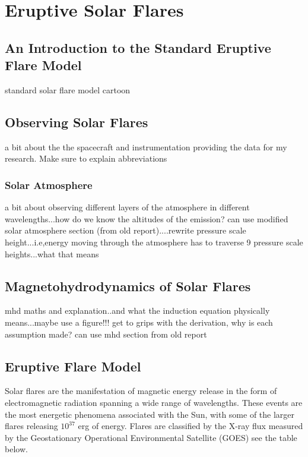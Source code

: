 \section{Eruptive Solar Flares}
\subsection{An Introduction to the Standard Eruptive Flare Model} 
standard solar flare model
cartoon
\subsection{Observing Solar Flares}
a bit about the the spacecraft and instrumentation providing the data for my research. Make sure to explain abbreviations
\subsubsection{Solar Atmosphere}
a bit about observing different layers of the atmosphere in different wavelengths...how do we know the altitudes of the emission?
can use modified solar atmosphere section (from old report)....rewrite pressure scale height...i.e,energy moving through the atmosphere has to traverse 9 pressure scale heights...what that means
\subsection{Magnetohydrodynamics of Solar Flares}
mhd maths and explanation..and what the induction equation physically means...maybe use a figure!!!
get to grips with the derivation, why is each assumption made?
can use mhd section from old report




\subsection{Eruptive Flare Model}\label{EFM}
Solar flares are the manifestation of magnetic energy release in the form of electromagnetic radiation spanning a wide range of wavelengths. These events are the most energetic phenomena associated with the Sun, with some of the larger flares releasing $10^{37}$ erg of energy. Flares are classified by the X-ray flux measured by the Geostationary Operational Environmental Satellite (GOES) see the table below.


